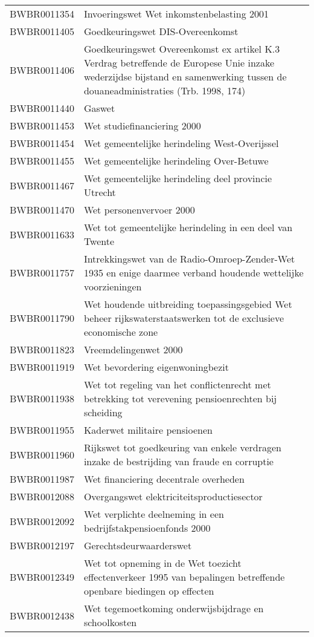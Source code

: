 \begin{longtable}{lp{}}
BWBR0011354 & Invoeringswet Wet inkomstenbelasting 2001 \\
BWBR0011405 & Goedkeuringswet DIS-Overeenkomst \\
BWBR0011406 & Goedkeuringswet Overeenkomst ex artikel K.3 Verdrag betreffende de Europese Unie inzake wederzijdse bijstand en samenwerking tussen de douaneadministraties (Trb. 1998, 174) \\
BWBR0011440 & Gaswet \\
BWBR0011453 & Wet studiefinanciering 2000 \\
BWBR0011454 & Wet gemeentelijke herindeling West-Overijssel \\
BWBR0011455 & Wet gemeentelijke herindeling Over-Betuwe \\
BWBR0011467 & Wet gemeentelijke herindeling deel provincie Utrecht \\
BWBR0011470 & Wet personenvervoer 2000 \\
BWBR0011633 & Wet tot gemeentelijke herindeling in een deel van Twente \\
BWBR0011757 & Intrekkingswet van de Radio-Omroep-Zender-Wet 1935 en enige daarmee verband houdende wettelijke voorzieningen \\
BWBR0011790 & Wet houdende uitbreiding toepassingsgebied Wet beheer rijkswaterstaatswerken tot de exclusieve economische zone \\
BWBR0011823 & Vreemdelingenwet 2000 \\
BWBR0011919 & Wet bevordering eigenwoningbezit \\
BWBR0011938 & Wet tot regeling van het conflictenrecht met betrekking tot verevening pensioenrechten bij scheiding \\
BWBR0011955 & Kaderwet militaire pensioenen \\
BWBR0011960 & Rijkswet tot goedkeuring van enkele verdragen inzake de bestrijding van fraude en corruptie \\
BWBR0011987 & Wet financiering decentrale overheden \\
BWBR0012088 & Overgangswet elektriciteitsproductiesector \\
BWBR0012092 & Wet verplichte deelneming in een bedrijfstakpensioenfonds 2000 \\
BWBR0012197 & Gerechtsdeurwaarderswet \\
BWBR0012349 & Wet tot opneming in de Wet toezicht effectenverkeer 1995 van bepalingen betreffende openbare biedingen op effecten \\
BWBR0012438 & Wet tegemoetkoming onderwijsbijdrage en schoolkosten \\

\end{longtable}
